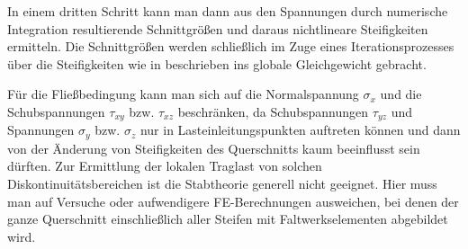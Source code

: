 In einem dritten Schritt kann man dann aus den Spannungen durch numerische Integration resultierende Schnittgr\"{o}{\ss}en und daraus nichtlineare Steifigkeiten ermitteln. Die Schnittgr\"{o}{\ss}en werden schlie{\ss}lich im Zuge eines Iterationsprozesses \"{u}ber die Steifigkeiten wie in \cite{Katz3} beschrieben ins globale Gleichgewicht gebracht.

F\"{u}r die Flie{\ss}bedingung kann man sich auf die Normalspannung $\sigma_x$ und die Schubspannungen $\tau_{xy}$ bzw. $\tau_{xz}$  beschr\"{a}nken, da Schubspannungen $\tau_{yz}$  und Spannungen $\sigma_y$ bzw. $\sigma_z$ nur in Lasteinleitungspunkten auftreten k\"{o}nnen und dann von der \"{A}nderung von Steifigkeiten des Querschnitts kaum beeinflusst sein d\"{u}rften. Zur Ermittlung der lokalen Traglast von solchen Diskontinuit\"{a}tsbereichen ist die Stabtheorie generell nicht geeignet. Hier muss man auf Versuche oder aufwendigere FE-Berechnungen ausweichen, bei denen der ganze Querschnitt einschlie{\ss}lich aller Steifen mit Faltwerkselementen abgebildet wird.

